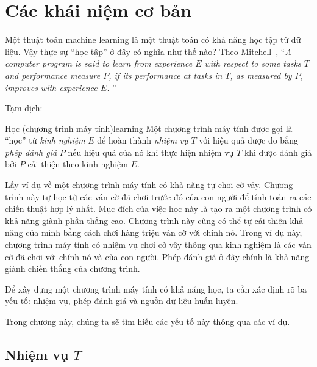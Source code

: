
\chapter{Các khái niệm cơ bản}



Một thuật toán machine learning là một thuật toán có khả năng {học tập} từ dữ
liệu. Vậy thực sự ``học tập'' ở đây có nghĩa như thế nào? Theo
Mitchell~\cite{mitchell1997machine}, ``\textit{A computer program is said to learn from
\textit{experience} $E$ with respect to some \textit{tasks} $T$ and
\textit{performance measure} $P$, if its performance at tasks in $T$, as
measured by $P$, improves with experience $E$.}
''

Tạm dịch: 

\begin{mydef}{Học (chương trình máy tính)}{learning}
Một chương trình máy tính được gọi là ``học'' từ \textit{kinh nghiệm} $E$
để hoàn thành \textit{nhiệm vụ} $T$ với hiệu quả được đo bằng \textit{phép đánh
giá} $P$ nếu hiệu quả của nó khi thực hiện nhiệm vụ $T$ khi được đánh giá bởi
$P$ cải thiện theo kinh nghiệm $E$.
\end{mydef}

Lấy ví dụ về một chương trình máy tính có khả năng tự chơi cờ vây. Chương trình này tự học từ các ván cờ đã chơi trước đó của con người để tính toán ra các chiến thuật hợp lý nhất. Mục đích của việc học này là tạo ra một chương trình có khả năng giành phần thắng cao. Chương trình này cũng có thể tự cải thiện khả năng của mình bằng cách chơi hàng triệu ván cờ với chính nó. Trong ví dụ này, chương trình máy tính có nhiệm vụ chơi cờ vây thông qua kinh nghiệm là {các ván cờ đã chơi} với chính nó và của con người. Phép đánh giá ở đây chính là khả năng giành chiến thắng của chương trình.

Để xây dựng một chương trình máy tính có khả năng học, ta cần xác định rõ ba yếu tố: nhiệm vụ, phép đánh giá và nguồn dữ liệu huấn luyện. 

Trong chương này, chúng ta sẽ tìm hiểu các yếu tố này thông qua các ví dụ.

\section{Nhiệm vụ $T$}



